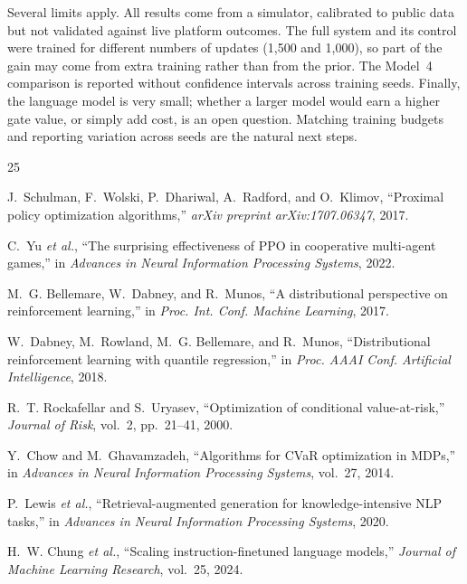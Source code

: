 \documentclass[conference]{IEEEtran}
\begin{document}
Several limits apply. All results come from a simulator, calibrated to public data but not validated against live platform outcomes. The full system and its control were trained for different numbers of updates (1,500 and 1,000), so part of the gain may come from extra training rather than from the prior. The Model~4 comparison is reported without confidence intervals across training seeds. Finally, the language model is very small; whether a larger model would earn a higher gate value, or simply add cost, is an open question. Matching training budgets and reporting variation across seeds are the natural next steps.

\begin{thebibliography}{25}

J.~Schulman, F.~Wolski, P.~Dhariwal, A.~Radford, and O.~Klimov, ``Proximal policy optimization algorithms,'' \emph{arXiv preprint arXiv:1707.06347}, 2017.

C.~Yu \emph{et al.}, ``The surprising effectiveness of PPO in cooperative multi-agent games,'' in \emph{Advances in Neural Information Processing Systems}, 2022.

M.~G. Bellemare, W.~Dabney, and R.~Munos, ``A distributional perspective on reinforcement learning,'' in \emph{Proc. Int. Conf. Machine Learning}, 2017.

W.~Dabney, M.~Rowland, M.~G. Bellemare, and R.~Munos, ``Distributional reinforcement learning with quantile regression,'' in \emph{Proc. AAAI Conf. Artificial Intelligence}, 2018.

R.~T. Rockafellar and S.~Uryasev, ``Optimization of conditional value-at-risk,'' \emph{Journal of Risk}, vol.~2, pp.~21--41, 2000.

Y.~Chow and M.~Ghavamzadeh, ``Algorithms for CVaR optimization in MDPs,'' in \emph{Advances in Neural Information Processing Systems}, vol.~27, 2014.

P.~Lewis \emph{et al.}, ``Retrieval-augmented generation for knowledge-intensive NLP tasks,'' in \emph{Advances in Neural Information Processing Systems}, 2020.

H.~W. Chung \emph{et al.}, ``Scaling instruction-finetuned language models,'' \emph{Journal of Machine Learning Research}, vol.~25, 2024.


\end{thebibliography}
\end{document}
